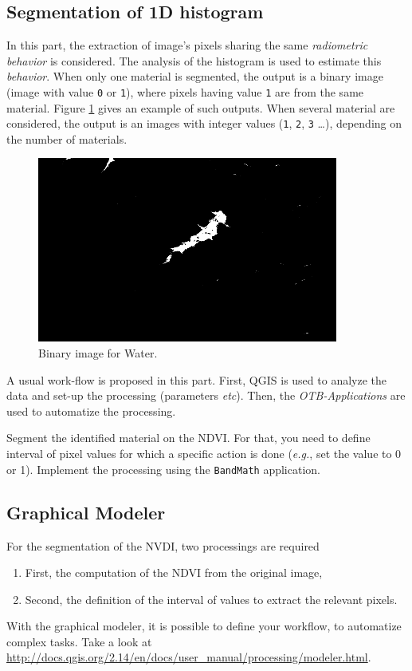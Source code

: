 \documentclass[a4paper,11pt,DIV=18]{scrartcl}
\begin{document}
\subsection{Segmentation of 1D histogram}
\label{sec:org1c17f8d}
In  this part,  the  extraction  of image's  pixels  sharing the  same
\emph{radiometric behavior} is considered.  The  analysis of the histogram is
used to estimate this \emph{behavior}.   When only one material is segmented,
the output is a  binary image (image with value \texttt{0}  or \texttt{1}), where pixels
having  value \texttt{1}  are from  the same  material.  Figure  \ref{fig:orga430a9c}
gives  an  example  of  such   outputs.   When  several  material  are
considered, the output is an images with integer values (\texttt{1}, \texttt{2}, \texttt{3} \ldots{}),
depending on the number of materials.

\begin{figure}[htbp]
\centering
\includegraphics[width=0.65\linewidth]{./figures/quicklook_seg_eau.png}
\caption{\label{fig:orga430a9c}
Binary image for Water.}
\end{figure}

A usual  work-flow is proposed  in this part.  First, QGIS is  used to
analyze the data and set-up the processing (parameters \emph{etc}). Then, the
\emph{OTB-Applications} are used to automatize the processing.

\begin{work}
Segment the  identified material on the  NDVI.  For that, you  need to
define interval  of pixel values for  which a specific action  is done
(\emph{e.g.}, set the  value to 0 or 1).  Implement  the processing using the
\texttt{BandMath} application.
\end{work}
\subsection{Graphical Modeler}
\label{sec:orge264db4}
For the segmentation of the NVDI, two processings are required
\begin{enumerate}
\item First, the computation of the NDVI from the original image,
\item Second,  the definition of  the interval  of values to  extract the
relevant pixels.
\end{enumerate}
With the graphical modeler, it is possible to define your workflow, to
automatize      complex      tasks.      Take      a      look      at
\url{http://docs.qgis.org/2.14/en/docs/user\_manual/processing/modeler.html}.
\end{document}
